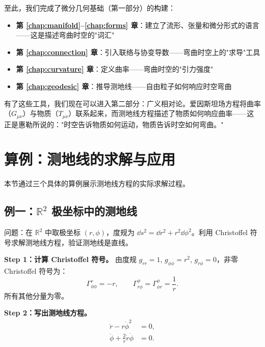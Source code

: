 \begin{note}
至此，我们完成了微分几何基础（第一部分）的构建：
\begin{itemize}
    \item \textbf{第 \ref{chap:manifold}--\ref{chap:forms} 章}：建立了流形、张量和微分形式的语言——这是描述弯曲时空的"词汇"
    \item \textbf{第 \ref{chap:connection} 章}：引入联络与协变导数——弯曲时空上的"求导"工具
    \item \textbf{第 \ref{chap:curvature} 章}：定义曲率——弯曲时空的"引力强度"
    \item \textbf{第 \ref{chap:geodesic} 章}：推导测地线——自由粒子如何响应时空弯曲
\end{itemize}
有了这些工具，我们现在可以进入第二部分：广义相对论。爱因斯坦场方程将曲率（$G_{\mu\nu}$）与物质（$T_{\mu\nu}$）联系起来，而测地线方程描述了物质如何响应曲率——这正是惠勒所说的："时空告诉物质如何运动，物质告诉时空如何弯曲。" \cite{Misner1973}
\end{note}

\section{算例：测地线的求解与应用}
\label{sec:examples}

本节通过三个具体的算例展示测地线方程的实际求解过程。

\subsection{例一：$\mathbb{R}^2$ 极坐标中的测地线}

问题：在 $\mathbb{R}^2$ 中取极坐标 $(r, \phi)$，度规为 $\dd s^2 = \dd r^2 + r^2 \dd\phi^2$。利用 Christoffel 符号求解测地线方程，验证测地线是直线。

\textbf{Step 1：计算 Christoffel 符号。} 由度规 $g_{rr} = 1$, $g_{\phi\phi} = r^2$, $g_{r\phi} = 0$，非零 Christoffel 符号为：
\begin{equation}
    \Gamma^r_{\phi\phi} = -r, \qquad \Gamma^\phi_{r\phi} = \Gamma^\phi_{\phi r} = \frac{1}{r}.
\end{equation}
所有其他分量为零。

\textbf{Step 2：写出测地线方程。}
\begin{align}
    \ddot r - r \dot\phi^2 &= 0, \label{eq:polar_r}\\
    \ddot\phi + \frac{2}{r} \dot r \dot\phi &= 0. \label{eq:polar_phi}
\end{align}

